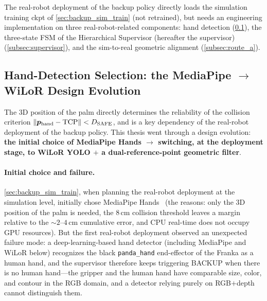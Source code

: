 The real-robot deployment of the backup policy directly loads the simulation training ckpt of \cref{sec:backup_sim_train} (not retrained), but needs an engineering implementation on three real-robot-related components: hand detection (\cref{sec:hand_detection_evolution}), the three-state FSM of the Hierarchical Supervisor (hereafter the supervisor) (\cref{subsec:supervisor}), and the sim-to-real geometric alignment (\cref{subsec:route_a}).

\subsection{Hand-Detection Selection: the MediaPipe $\to$ WiLoR Design Evolution}\label{sec:hand_detection_evolution}

The 3D position of the palm directly determines the reliability of the collision criterion $\lVert \bm{p}_\text{hand} - \text{TCP}\rVert < D_\text{SAFE}$, and is a key dependency of the real-robot deployment of the backup policy. This thesis went through a design evolution: \textbf{the initial choice of MediaPipe Hands $\to$ switching, at the deployment stage, to WiLoR YOLO $+$ a dual-reference-point geometric filter}.

\paragraph{Initial choice and failure.} \cref{sec:backup_sim_train}, when planning the real-robot deployment at the simulation level, initially chose MediaPipe Hands~\cite{zhang2020mediapipe} (the reasons: only the 3D position of the palm is needed, the $8$\,cm collision threshold leaves a margin relative to the $\sim 2$--$4$\,cm cumulative error, and CPU real-time does not occupy GPU resources). But the first real-robot deployment observed an unexpected failure mode: a deep-learning-based hand detector (including MediaPipe and WiLoR below) recognizes the black \texttt{panda\_hand} end-effector of the Franka as a human hand, and the supervisor therefore keeps triggering BACKUP when there is no human hand---the gripper and the human hand have comparable size, color, and contour in the RGB domain, and a detector relying purely on RGB$+$depth cannot distinguish them.

